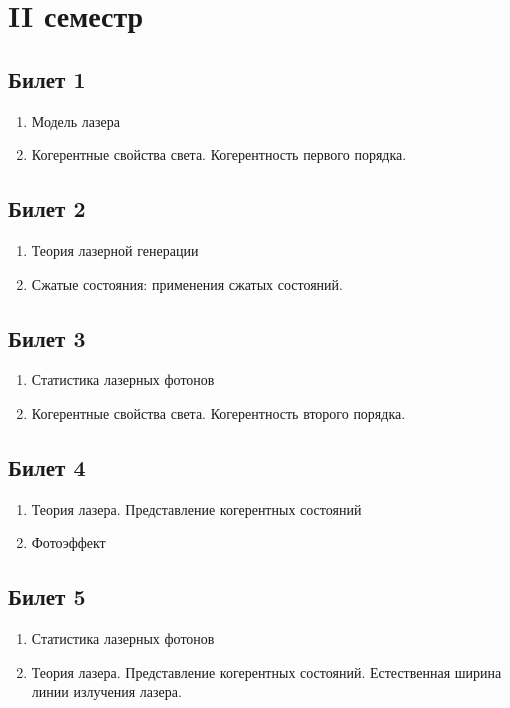 \documentclass[12pt,a4paper]{article}
\begin{document}
\section*{II семестр}


\subsection*{Билет 1} 
\begin{enumerate}
\item Модель лазера
\item Когерентные свойства света.
 Когерентность первого порядка.
\end{enumerate}

\subsection*{Билет 2} 
\begin{enumerate}
\item Теория лазерной генерации
\item Сжатые состояния: применения сжатых состояний. 
\end{enumerate}

\subsection*{Билет 3} 
\begin{enumerate}
\item Статистика лазерных фотонов
\item Когерентные свойства света.
 Когерентность второго порядка.
\end{enumerate}

\subsection*{Билет 4} 
\begin{enumerate}
\item Теория лазера. Представление когерентных состояний
\item Фотоэффект
\end{enumerate}

\subsection*{Билет 5} 
\begin{enumerate}
\item Статистика лазерных фотонов
\item Теория лазера. Представление когерентных состояний. Естественная
  ширина линии излучения лазера.
\end{enumerate}
\end{document}
